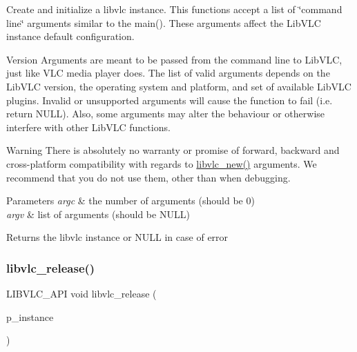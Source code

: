 Create and initialize a libvlc instance. This functions accept a list of \char`\"{}command line\char`\"{} arguments similar to the main(). These arguments affect the Lib\+V\+LC instance default configuration.

\begin{DoxyVersion}{Version}
Arguments are meant to be passed from the command line to Lib\+V\+LC, just like V\+LC media player does. The list of valid arguments depends on the Lib\+V\+LC version, the operating system and platform, and set of available Lib\+V\+LC plugins. Invalid or unsupported arguments will cause the function to fail (i.\+e. return N\+U\+LL). Also, some arguments may alter the behaviour or otherwise interfere with other Lib\+V\+LC functions.
\end{DoxyVersion}
\begin{DoxyWarning}{Warning}
There is absolutely no warranty or promise of forward, backward and cross-\/platform compatibility with regards to \hyperlink{group__libvlc__core_ga1ecba605b37df9e62d2f8c0290ef3893}{libvlc\+\_\+new()} arguments. We recommend that you do not use them, other than when debugging.
\end{DoxyWarning}

\begin{DoxyParams}{Parameters}
{\em argc} & the number of arguments (should be 0) \\
\hline
{\em argv} & list of arguments (should be N\+U\+LL) \\
\hline
\end{DoxyParams}
\begin{DoxyReturn}{Returns}
the libvlc instance or N\+U\+LL in case of error 
\end{DoxyReturn}
\mbox{\label{group__libvlc__core_ga42f80821f3b5e2e9a1fe38c96d40ee71}} 
\subsubsection{\texorpdfstring{libvlc\+\_\+release()}{libvlc\_release()}}
{\footnotesize\ttfamily L\+I\+B\+V\+L\+C\+\_\+\+A\+PI void libvlc\+\_\+release (\begin{DoxyParamCaption}\item[{\hyperlink{group__libvlc__core_ga316d739a80da4678206c79f4d6c2e284}{libvlc\+\_\+instance\+\_\+t} $\ast$}]{p\+\_\+instance }\end{DoxyParamCaption})}

